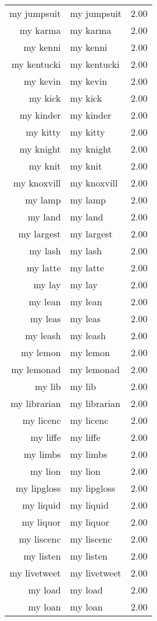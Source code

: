\begin{table}[ht]
\begin{tabular}{rlr}
  my jumpsuit & my jumpsuit & 2.00 \\ 
  my karma & my karma & 2.00 \\ 
  my kenni & my kenni & 2.00 \\ 
  my kentucki & my kentucki & 2.00 \\ 
  my kevin & my kevin & 2.00 \\ 
  my kick & my kick & 2.00 \\ 
  my kinder & my kinder & 2.00 \\ 
  my kitty & my kitty & 2.00 \\ 
  my knight & my knight & 2.00 \\ 
  my knit & my knit & 2.00 \\ 
  my knoxvill & my knoxvill & 2.00 \\ 
  my lamp & my lamp & 2.00 \\ 
  my land & my land & 2.00 \\ 
  my largest & my largest & 2.00 \\ 
  my lash & my lash & 2.00 \\ 
  my latte & my latte & 2.00 \\ 
  my lay & my lay & 2.00 \\ 
  my lean & my lean & 2.00 \\ 
  my leas & my leas & 2.00 \\ 
  my leash & my leash & 2.00 \\ 
  my lemon & my lemon & 2.00 \\ 
  my lemonad & my lemonad & 2.00 \\ 
  my lib & my lib & 2.00 \\ 
  my librarian & my librarian & 2.00 \\ 
  my licenc & my licenc & 2.00 \\ 
  my liffe & my liffe & 2.00 \\ 
  my limbs & my limbs & 2.00 \\ 
  my lion & my lion & 2.00 \\ 
  my lipgloss & my lipgloss & 2.00 \\ 
  my liquid & my liquid & 2.00 \\ 
  my liquor & my liquor & 2.00 \\ 
  my liscenc & my liscenc & 2.00 \\ 
  my listen & my listen & 2.00 \\ 
  my livetweet & my livetweet & 2.00 \\ 
  my load & my load & 2.00 \\ 
  my loan & my loan & 2.00 \\ 

\end{tabular}
\end{table}
